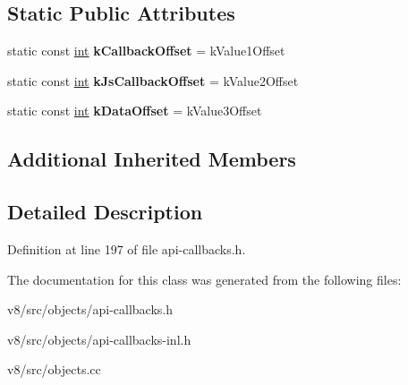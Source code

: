 \subsection*{Static Public Attributes}
\begin{DoxyCompactItemize}
\item 
\mbox{\label{classv8_1_1internal_1_1CallHandlerInfo_ad9aed9fb5614164f1b8d192b302790b5}} 
static const \mbox{\hyperlink{classint}{int}} {\bfseries k\+Callback\+Offset} = k\+Value1\+Offset
\item 
\mbox{\label{classv8_1_1internal_1_1CallHandlerInfo_a7c3cdf16f8c7b589b998445dce355487}} 
static const \mbox{\hyperlink{classint}{int}} {\bfseries k\+Js\+Callback\+Offset} = k\+Value2\+Offset
\item 
\mbox{\label{classv8_1_1internal_1_1CallHandlerInfo_aa561bcb66c855ae71541ccd05e8ba070}} 
static const \mbox{\hyperlink{classint}{int}} {\bfseries k\+Data\+Offset} = k\+Value3\+Offset
\end{DoxyCompactItemize}
\subsection*{Additional Inherited Members}


\subsection{Detailed Description}


Definition at line 197 of file api-\/callbacks.\+h.



The documentation for this class was generated from the following files\+:\begin{DoxyCompactItemize}
\item 
v8/src/objects/api-\/callbacks.\+h\item 
v8/src/objects/api-\/callbacks-\/inl.\+h\item 
v8/src/objects.\+cc\end{DoxyCompactItemize}
